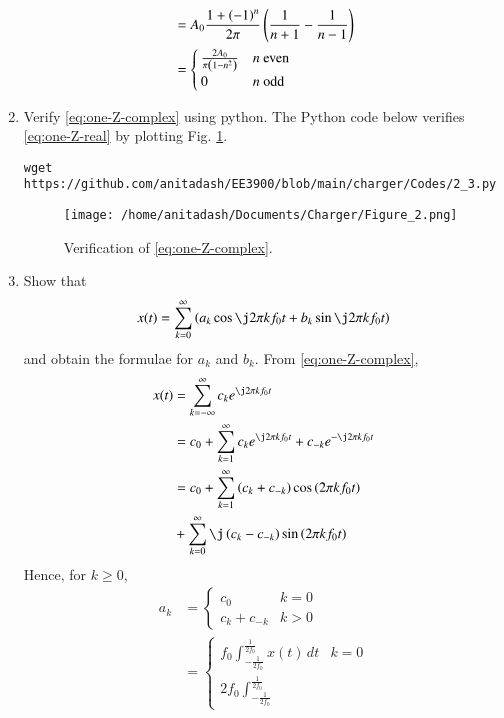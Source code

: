 \documentclass[journal,12pt,twocolumn]{IEEEtran}
\renewcommand\thesection{\arabic{section}}
\begin{document}
\begin{enumerate}[label=\thesection.\arabic*,ref=\thesection.\theenumi]
\begin{align}
        &= A_0\frac{1+\left(-1\right)^n}{2\pi}\left(\frac{1}{n+1} - \frac{1}{n-1}\right) \\
        &= 
        \begin{cases}
            \frac{2A_0}{\pi\left(1-n^2\right)} & n\ \text{even} \\
            0 & n\ \text{odd}
        \end{cases}
        \label{eq:ck-xt}
\end{align}
\item Verify \eqref{eq:one-Z-complex} using python.
\solution The Python code below verifies \eqref{eq:one-Z-real}
by plotting Fig. \ref{fig:ver-complex}.
\begin{lstlisting}
wget https://github.com/anitadash/EE3900/blob/main/charger/Codes/2_3.py
\end{lstlisting}
\begin{figure}[!ht]
    \texttt{[image: /home/anitadash/Documents/Charger/Figure\_2.png]}
    \caption{Verification of \eqref{eq:one-Z-complex}.}
    \label{fig:ver-complex}
\end{figure}
\item Show that 
\begin{align}
	x(t) = \sum_{k = 0}^{\infty}\brak{a_k\cos{\j2\pi kf_0 t}+b_k\sin{\j2\pi kf_0 t}}
\label{eq:one-Z-real}
\end{align}
and obtain the formulae for $a_k$ and $b_k$.
\solution From \eqref{eq:one-Z-complex},
\begin{align}
    x(t) &= \sum_{k = -\infty}^{\infty}c_ke^{\j2\pi kf_0 t} \\
         &= c_0 + \sum_{k = 1}^{\infty}c_ke^{\j2\pi kf_0t} + c_{-k}e^{-\j2\pi kf_0t} \\
         &= c_0 + \sum_{k = 1}^{\infty}\brak{c_k + c_{-k}}\cos\brak{2\pi kf_0t}  \nonumber \\
         &+ \sum_{k = 0}^{\infty}\j\brak{c_k - c_{-k}}\sin\brak{2\pi kf_0t}
\end{align}
Hence, for $k \ge 0$,
\begin{align}
    a_k &= 
    \begin{cases}
        c_0 & k = 0 \\
        c_k + c_{-k} & k > 0
    \end{cases} \label{eq:ak} \\
        &=
    \begin{cases}
        f_0\int_{-\frac{1}{2f_0}}^{\frac{1}{2f_0}}x(t)\, dt & k = 0 \\
        2f_0\int_{-\frac{1}{2f_0}}^{\frac{1}{2f_0}}

\end{cases}
\end{align}
\end{enumerate}
\end{document}
